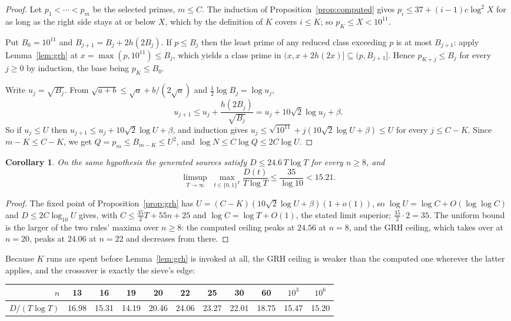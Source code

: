 \documentclass[11pt]{article}
\newtheorem{corollary}[theorem]{Corollary}
\theoremstyle{remark}
\begin{document}
\begin{proof}
Let $p_1<\cdots<p_m$ be the selected primes, $m\le C$.  The induction of
Proposition~\ref{prop:computed} gives $p_i\le37+(i-1)c\log^2X$ for as long as
the right side stays at or below $X$, which by the definition of $K$ covers
$i\le K$; so $p_K\le X<10^{11}$.

Put $B_0=10^{11}$ and $B_{j+1}=B_j+2h(2B_j)$.  If $p\le B_j$ then the least
prime of any reduced class exceeding $p$ is at most $B_{j+1}$: apply
Lemma~\ref{lem:grh} at $x=\max(p,10^{11})\le B_j$, which yields a class prime
in $(x,x+2h(2x)]\subseteq(p,B_{j+1}]$.  Hence $p_{K+j}\le B_j$ for every
$j\ge0$ by induction, the base being $p_K\le B_0$.

Write $u_j=\sqrt{B_j}$.  From $\sqrt{a+b}\le\sqrt a+b/(2\sqrt a)$ and
$\tfrac12\log B_j=\log u_j$,
\[
  u_{j+1}\le u_j+\frac{h(2B_j)}{\sqrt{B_j}}
         = u_j+10\sqrt2\log u_j+\beta .
\]
So if $u_j\le U$ then $u_{j+1}\le u_j+10\sqrt2\log U+\beta$, and induction
gives $u_j\le\sqrt{10^{11}}+j(10\sqrt2\log U+\beta)\le U$ for every
$j\le C-K$.  Since $m-K\le C-K$, we get $Q=p_m\le B_{m-K}\le U^2$, and
$\log N\le C\log Q\le2C\log U$.
\end{proof}

\begin{corollary}\label{cor:grh}
On the same hypothesis the generated sources satisfy
$D\le24.6\,T\log T$ for every $n\ge8$, and
\[
  \limsup_{T\to\infty}\;\max_{t\in\{0,1\}^T}\frac{D(t)}{T\log T}
  \le\frac{35}{\log10}<15.21 .
\]
\end{corollary}

\begin{proof}
The fixed point of Proposition~\ref{prop:grh} has
$U=(C-K)(10\sqrt2\log U+\beta)(1+o(1))$, so $\log U=\log C+O(\log\log C)$ and
$D\le2C\log_{10}U$ gives, with $C\le\frac{35}{2}T+55n+25$ and
$\log C=\log T+O(1)$, the stated limit superior; $\frac{35}{2}\cdot2=35$.
The uniform bound is the larger of the two rules' maxima over $n\ge8$: the
computed ceiling peaks at $24.56$ at $n=8$, and the GRH ceiling, which takes
over at $n=20$, peaks at $24.06$ at $n=22$ and decreases from there.
\end{proof}

Because $K$ runs are spent before Lemma~\ref{lem:grh} is invoked at all, the
GRH ceiling is weaker than the computed one wherever the latter applies, and
the crossover is exactly the sieve's edge:

\begin{center}
\begin{tabular}{r|cccc|cccccc}
$n$ & 13 & 16 & 19 & 20 & 22 & 25 & 30 & 60 & $10^3$ & $10^6$\\ \hline
$D/(T\log T)$ & 16.98 & 15.31 & 14.19 & 20.46 & 24.06 & 23.27 & 22.01 & 18.75
& 15.47 & 15.20
\end{tabular}
\end{center}
\end{document}
